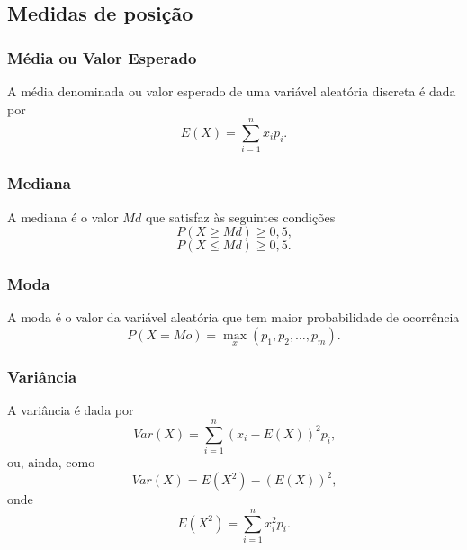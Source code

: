 \documentclass[11pt,fleqn]{book}
\numberwithin{mpicture}{chapter}
\numberwithin{mtable}{chapter}
\numberwithin{mframe}{chapter}
\begin{document}
\subsection{Medidas de posição}

\subsubsection*{Média ou Valor Esperado}

A média denominada  ou valor esperado de uma variável aleatória discreta é dada por
\begin{equation}
	E(X)=\sum_{i=1}^{n} x_i p_i\text{.}
\end{equation}

\subsubsection*{Mediana}

A mediana é o valor $Md$ que satisfaz às seguintes condições
\begin{equation}
	P(X \geqslant Md) \geqslant 0,5\text{,}
\end{equation}
\begin{equation}
	P(X \leqslant Md) \geqslant 0,5\text{.}
\end{equation}

\subsubsection*{Moda}

A moda é o valor da variável aleatória que tem maior probabilidade de ocorrência
\begin{equation}
	P(X=Mo)=\max_{x} (p_1, p_2, \dots, p_m)\text{.}
\end{equation}

\subsubsection*{Variância}

A variância é dada por
\begin{equation}
	Var(X)=\sum_{i=1}^{n} (x_i - E(X))^2 p_i\text{,}
\end{equation}
ou, ainda, como
\begin{equation}
	Var(X)=E(X^2)-(E(X))^2\text{,}
\end{equation}
onde 
\begin{equation}
	E(X^2)=\sum_{i=1}^{n} x_i^2 p_i\text{.}
\end{equation}
\end{document}
